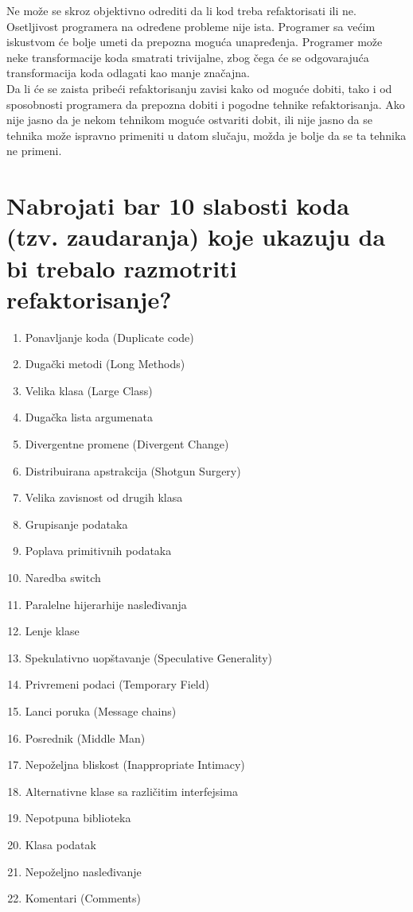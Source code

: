 \documentclass[a4paper]{article}
\begin{document}
  Ne može se skroz objektivno odrediti da li kod treba refaktorisati ili ne. Osetljivost programera
  na određene probleme nije ista. Programer sa većim iskustvom će bolje umeti da prepozna
  moguća unapređenja. Programer može neke transformacije koda smatrati trivijalne, zbog čega
  će se odgovarajuća transformacija koda odlagati kao manje značajna.\\
  \indent Da li će se zaista pribeći refaktorisanju zavisi kako od moguće dobiti, tako i od sposobnosti 
  programera da prepozna dobiti i pogodne tehnike refaktorisanja. 
  Ako nije jasno da je nekom tehnikom moguće ostvariti dobit, 
  ili nije jasno da se tehnika može ispravno primeniti u datom slučaju, 
  možda je bolje da se ta tehnika ne primeni.

\section{Nabrojati bar 10 slabosti koda (tzv. zaudaranja) 
         koje ukazuju da bi trebalo razmotriti refaktorisanje?} 
\begin{enumerate}
  \item Ponavljanje koda (Duplicate code)
  \item Dugački metodi (Long Methods)
  \item Velika klasa (Large Class)
  \item Dugačka lista argumenata
  \item Divergentne promene (Divergent Change)
  \item Distribuirana apstrakcija (Shotgun Surgery)
  \item Velika zavisnost od drugih klasa 
  \item Grupisanje podataka
  \item Poplava primitivnih podataka
  \item Naredba switch
  \item Paralelne hijerarhije nasleđivanja
  \item Lenje klase
  \item Spekulativno uopštavanje (Speculative Generality)
  \item Privremeni podaci (Temporary Field)
  \item Lanci poruka (Message chains)
  \item Posrednik (Middle Man)
  \item Nepoželjna bliskost (Inappropriate Intimacy)
  \item Alternativne klase sa različitim interfejsima
  \item Nepotpuna biblioteka
  \item Klasa podatak
  \item Nepoželjno nasleđivanje
  \item Komentari (Comments) \cite{rg_refactoring}
\end{enumerate}
\end{document}
